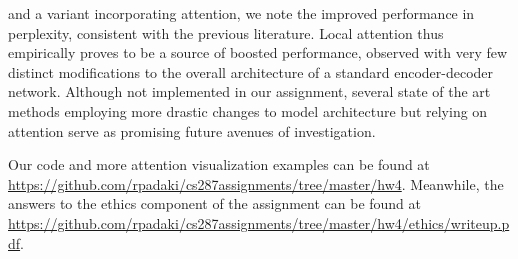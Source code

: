 \documentclass[11pt]{article}
\begin{document}
and a variant incorporating attention, we note the improved performance in perplexity, consistent with the previous literature. Local attention thus empirically proves to be a source of boosted performance, observed with very few distinct modifications to the overall architecture of a standard encoder-decoder network. Although not implemented in our assignment, several state of the art methods employing more drastic changes to model architecture but relying on attention serve as promising future avenues of investigation.






Our code and more attention visualization examples can be found at \url{https://github.com/rpadaki/cs287assignments/tree/master/hw4}. Meanwhile, the answers to the ethics component of the assignment can be found at \url{https://github.com/rpadaki/cs287assignments/tree/master/hw4/ethics/writeup.pdf}.



\end{document}

